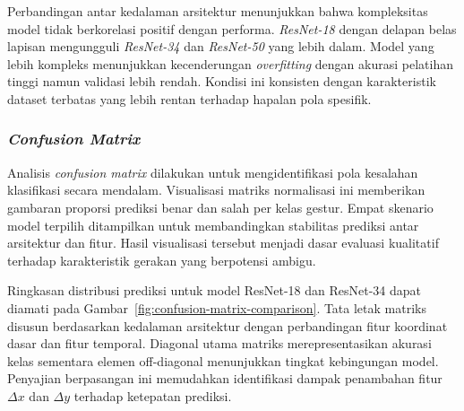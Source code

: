 Perbandingan antar kedalaman arsitektur menunjukkan bahwa kompleksitas model tidak berkorelasi positif dengan performa.
\textit{ResNet-18} dengan delapan belas lapisan mengungguli \textit{ResNet-34} dan \textit{ResNet-50} yang lebih dalam.
Model yang lebih kompleks menunjukkan kecenderungan \textit{overfitting} dengan akurasi pelatihan tinggi namun validasi lebih rendah.
Kondisi ini konsisten dengan karakteristik dataset terbatas yang lebih rentan terhadap hapalan pola spesifik.

\subsubsection{\textit{Confusion Matrix}}
\label{subsubsec:confusion-matrix}

Analisis \textit{confusion matrix} dilakukan untuk mengidentifikasi pola kesalahan klasifikasi secara mendalam.
Visualisasi matriks normalisasi ini memberikan gambaran proporsi prediksi benar dan salah per kelas gestur.
Empat skenario model terpilih ditampilkan untuk membandingkan stabilitas prediksi antar arsitektur dan fitur.
Hasil visualisasi tersebut menjadi dasar evaluasi kualitatif terhadap karakteristik gerakan yang berpotensi ambigu.

Ringkasan distribusi prediksi untuk model ResNet-18 dan ResNet-34 dapat diamati pada Gambar~\ref{fig:confusion-matrix-comparison}.
Tata letak matriks disusun berdasarkan kedalaman arsitektur dengan perbandingan fitur koordinat dasar dan fitur temporal.
Diagonal utama matriks merepresentasikan akurasi kelas sementara elemen off-diagonal menunjukkan tingkat kebingungan model.
Penyajian berpasangan ini memudahkan identifikasi dampak penambahan fitur $\Delta x$ dan $\Delta y$ terhadap ketepatan prediksi.

